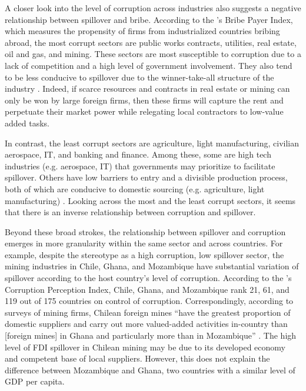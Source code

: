 A closer look into the level of corruption across industries also suggests a negative relationship between spillover and bribe. According to the \citet{TransparencyInternational2011}'s Bribe Payer Index, which measures the propensity of firms from industrialized countries bribing abroad, the most corrupt sectors are public works contracts, utilities, real estate, oil and gas, and mining. These sectors are most susceptible to corruption due to a lack of competition and a high level of government involvement. They also tend to be less conducive to spillover due to the winner-take-all structure of the industry \citep[138]{UNCTAD2001}. Indeed, if scarce resources and contracts in real estate or mining can only be won by large foreign firms, then these firms will capture the rent and perpetuate their market power while relegating local contractors to low-value added tasks.

In contrast, the least corrupt sectors are agriculture, light manufacturing, civilian aerospace, IT, and banking and finance. Among these, some are high tech industries (e.g. aerospace, IT) that governments may prioritize to facilitate spillover. Others have low barriers to entry and a divisible production process, both of which are conducive to domestic sourcing (e.g. agriculture, light manufacturing) \citep{TransparencyInternational2011}.  Looking across the most and the least corrupt sectors, it seems that there is an inverse relationship between corruption and spillover.

Beyond these broad strokes, the relationship between spillover and corruption emerges in more granularity within the same sector and across countries. For example, despite the stereotype as a high corruption, low spillover sector, the mining industries in Chile, Ghana, and Mozambique have substantial variation of spillover according to the host country's level of corruption. According to the \citet{TransparencyInternational2014}'s Corruption Perception Index, Chile, Ghana, and Mozambique rank 21, 61, and 119 out of 175 countries on control of corruption. Correspondingly, according to surveys of mining firms, Chilean foreign mines ``have the greatest proportion of domestic suppliers and carry out more valued-added activities in-country than [foreign mines] in Ghana and particularly more than in Mozambique'' \citep[127]{Farole2014}. The high level of FDI spillover in Chilean mining may be due to its developed economy and competent base of local suppliers. However, this does not explain the difference between Mozambique and Ghana, two countries with a similar level of GDP per capita.

